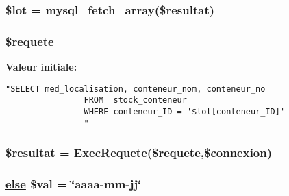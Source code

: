 \hypertarget{medicament__lot_8php_a1}{
\subsubsection[\$lot]{\setlength{\rightskip}{0pt plus 5cm}\$lot = mysql\_\-fetch\_\-array(\$resultat)}}
\label{medicament__lot_8php_a1}


\hypertarget{medicament__lot_8php_a3}{
\subsubsection[\$requete]{\setlength{\rightskip}{0pt plus 5cm}\$requete}}
\label{medicament__lot_8php_a3}


{\bf Valeur initiale:}

\footnotesize\begin{verbatim}"SELECT med_localisation, conteneur_nom, conteneur_no
                FROM  stock_conteneur
                WHERE conteneur_ID = '$lot[conteneur_ID]'
                "
\end{verbatim}\normalsize 
\hypertarget{medicament__lot_8php_a4}{
\subsubsection[\$resultat]{\setlength{\rightskip}{0pt plus 5cm}\$resultat = Exec\-Requete(\$requete,\$connexion)}}
\label{medicament__lot_8php_a4}


\hypertarget{medicament__lot_8php_a2}{
\subsubsection[\$val]{\setlength{\rightskip}{0pt plus 5cm}\hyperlink{cron_8php_a9}{else} \$val = \char`\"{}aaaa-mm-jj\char`\"{}}}
\label{medicament__lot_8php_a2}


